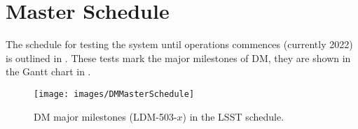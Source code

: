 
\section{Master Schedule\label{sect:schedule}}

The schedule for testing the system until operations commences (currently 2022)
is outlined in .
These tests mark the major milestones of DM, they are shown in the Gantt chart in .




\begin{figure}[htbp]
        \begin{center}
                 \texttt{[image: images/DMMasterSchedule]}
                 \caption{DM major milestones (LDM-503-$x$) in the LSST schedule. \label{fig:schedule}}
         \end{center}
 \end{figure}
